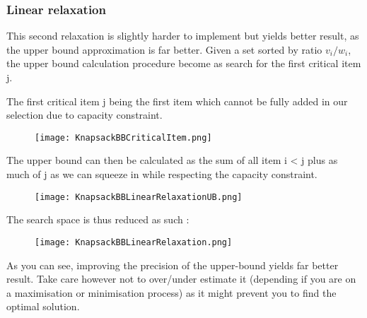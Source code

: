 \subsubsection{Linear relaxation}

This second relaxation is slightly harder to implement but yields better result, as 
the upper bound approximation is far better. Given a set sorted by ratio $v_i/w_i$,
the upper bound calculation procedure become as search for the first critical item j.
\newline

The first critical item j being the first item which cannot be fully added in our selection
due to capacity constraint. 

\begin{figure}[!ht]
    \centering
    \texttt{[image: KnapsackBBCriticalItem.png]}
    \label{fig:Knapsack_example}
\end{figure}
\FloatBarrier

The upper bound can then be calculated as the sum of all item i < j plus as much of j
as we can squeeze in while respecting the capacity constraint.

\begin{figure}[!ht]
    \centering
    \texttt{[image: KnapsackBBLinearRelaxationUB.png]}
    \label{fig:Knapsack_example}
\end{figure}
\FloatBarrier

The search space is thus reduced as such :

\begin{figure}[!ht]
    \centering
    \texttt{[image: KnapsackBBLinearRelaxation.png]}
    \label{fig:Knapsack_example}
\end{figure}
\FloatBarrier

As you can see, improving the precision of the upper-bound yields far better result. Take care however not to over/under estimate it (depending if you are on a maximisation or minimisation process) as it might prevent you to find the optimal solution.


